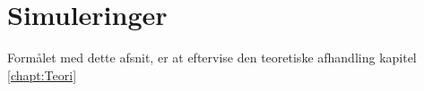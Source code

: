 \chapter{Simuleringer}
Formålet med dette afsnit, er at eftervise den teoretiske afhandling kapitel \ref{chapt:Teori}



